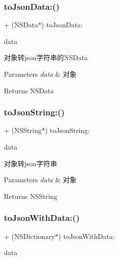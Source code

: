 \subsubsection{\texorpdfstring{to\+Json\+Data\+:()}{toJsonData:()}}
{\footnotesize\ttfamily + (N\+S\+Data$\ast$) to\+Json\+Data\+: \begin{DoxyParamCaption}\item[{(N\+S\+Object $\ast$)}]{data }\end{DoxyParamCaption}}

对象转json字符串的\+N\+S\+Data 
\begin{DoxyParams}{Parameters}
{\em data} & 对象 \\
\hline
\end{DoxyParams}
\begin{DoxyReturn}{Returns}
N\+S\+Data 
\end{DoxyReturn}
\mbox{\label{interface_json_utils_a2b3a0fbb19e8243047386b6650a2d8b8}} 
\subsubsection{\texorpdfstring{to\+Json\+String\+:()}{toJsonString:()}}
{\footnotesize\ttfamily + (N\+S\+String$\ast$) to\+Json\+String\+: \begin{DoxyParamCaption}\item[{(N\+S\+Object $\ast$)}]{data }\end{DoxyParamCaption}}

对象转json字符串 
\begin{DoxyParams}{Parameters}
{\em data} & 对象 \\
\hline
\end{DoxyParams}
\begin{DoxyReturn}{Returns}
N\+S\+String 
\end{DoxyReturn}
\mbox{\label{interface_json_utils_a9165a0ed9fba5546cadc3add89b25712}} 
\subsubsection{\texorpdfstring{to\+Json\+With\+Data\+:()}{toJsonWithData:()}}
{\footnotesize\ttfamily + (N\+S\+Dictionary$\ast$) to\+Json\+With\+Data\+: \begin{DoxyParamCaption}\item[{(N\+S\+Data $\ast$)}]{data }\end{DoxyParamCaption}}

